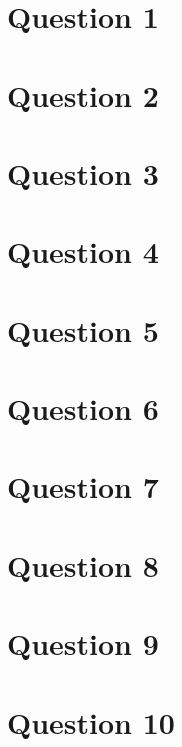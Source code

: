 \documentclass{article}
\begin{document}
\pagestyle{fancy}

\section*{Question 1}{
    
}

\section*{Question 2}{

}

\section*{Question 3}{

}

\section*{Question 4}{

}

\section*{Question 5}{

}

\section*{Question 6}{

}

\section*{Question 7}{

}

\section*{Question 8}{

}

\section*{Question 9}{

}

\section*{Question 10}{

}
\end{document}
